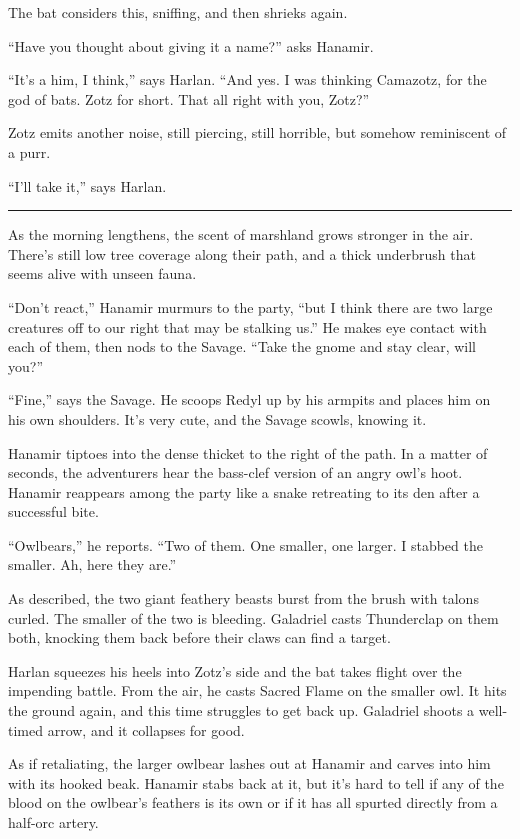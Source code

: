 \documentclass[smalldemyvopaper,11pt,twoside,onecolumn,openright,extrafontsizes]{memoir}
\begin{document}
The bat considers this, sniffing, and then shrieks again.

``Have you thought about giving it a name?'' asks Hanamir.

``It's a him, I think,'' says Harlan. ``And yes. I was thinking
Camazotz, for the god of bats. Zotz for short. That all right with you,
Zotz?''

Zotz emits another noise, still piercing, still horrible, but somehow
reminiscent of a purr.

``I'll take it,'' says Harlan.

\begin{center}\rule{0.5\linewidth}{\linethickness}\end{center}

As the morning lengthens, the scent of marshland grows stronger in the
air. There's still low tree coverage along their path, and a thick
underbrush that seems alive with unseen fauna.

``Don't react,'' Hanamir murmurs to the party, ``but I think there are
two large creatures off to our right that may be stalking us.'' He makes
eye contact with each of them, then nods to the Savage. ``Take the gnome
and stay clear, will you?''

``Fine,'' says the Savage. He scoops Redyl up by his armpits and places
him on his own shoulders. It's very cute, and the Savage scowls, knowing
it.

Hanamir tiptoes into the dense thicket to the right of the path. In a
matter of seconds, the adventurers hear the bass-clef version of an
angry owl's hoot. Hanamir reappears among the party like a snake
retreating to its den after a successful bite.

``Owlbears,'' he reports. ``Two of them. One smaller, one larger. I
stabbed the smaller. Ah, here they are.''

As described, the two giant feathery beasts burst from the brush with
talons curled. The smaller of the two is bleeding. Galadriel casts
Thunderclap on them both, knocking them back before their claws can find
a target.

Harlan squeezes his heels into Zotz's side and the bat takes flight over
the impending battle. From the air, he casts Sacred Flame on the smaller
owl. It hits the ground again, and this time struggles to get back up.
Galadriel shoots a well-timed arrow, and it collapses for good.

As if retaliating, the larger owlbear lashes out at Hanamir and carves
into him with its hooked beak. Hanamir stabs back at it, but it's hard
to tell if any of the blood on the owlbear's feathers is its own or if
it has all spurted directly from a half-orc artery.
\end{document}
